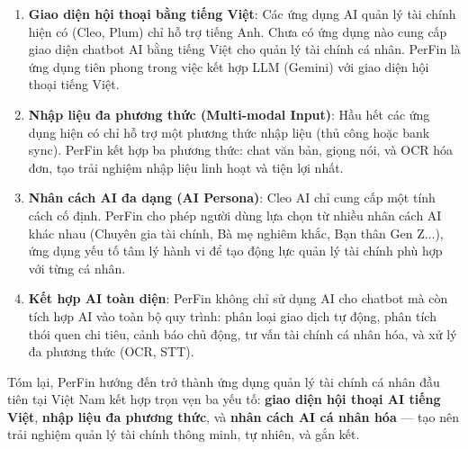 \begin{enumerate}
    \item \textbf{Giao diện hội thoại bằng tiếng Việt}: Các ứng dụng AI quản lý tài chính hiện có (Cleo, Plum) chỉ hỗ trợ tiếng Anh. Chưa có ứng dụng nào cung cấp giao diện chatbot AI bằng tiếng Việt cho quản lý tài chính cá nhân. PerFin là ứng dụng tiên phong trong việc kết hợp LLM (Gemini) với giao diện hội thoại tiếng Việt.

    \item \textbf{Nhập liệu đa phương thức (Multi-modal Input)}: Hầu hết các ứng dụng hiện có chỉ hỗ trợ một phương thức nhập liệu (thủ công hoặc bank sync). PerFin kết hợp ba phương thức: chat văn bản, giọng nói, và OCR hóa đơn, tạo trải nghiệm nhập liệu linh hoạt và tiện lợi nhất.

    \item \textbf{Nhân cách AI đa dạng (AI Persona)}: Cleo AI chỉ cung cấp một tính cách cố định. PerFin cho phép người dùng lựa chọn từ nhiều nhân cách AI khác nhau (Chuyên gia tài chính, Bà mẹ nghiêm khắc, Bạn thân Gen Z...), ứng dụng yếu tố tâm lý hành vi để tạo động lực quản lý tài chính phù hợp với từng cá nhân.

    \item \textbf{Kết hợp AI toàn diện}: PerFin không chỉ sử dụng AI cho chatbot mà còn tích hợp AI vào toàn bộ quy trình: phân loại giao dịch tự động, phân tích thói quen chi tiêu, cảnh báo chủ động, tư vấn tài chính cá nhân hóa, và xử lý đa phương thức (OCR, STT).
\end{enumerate}

Tóm lại, PerFin hướng đến trở thành ứng dụng quản lý tài chính cá nhân đầu tiên tại Việt Nam kết hợp trọn vẹn ba yếu tố: \textbf{giao diện hội thoại AI tiếng Việt}, \textbf{nhập liệu đa phương thức}, và \textbf{nhân cách AI cá nhân hóa} --- tạo nên trải nghiệm quản lý tài chính thông minh, tự nhiên, và gắn kết.
